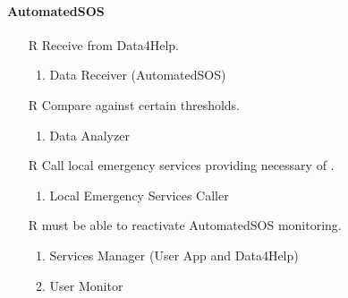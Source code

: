 \paragraph{AutomatedSOS}
\begin{itemize}
	\item[R\subs{36}]Receive  from Data4Help.
	\begin{enumerate}
		\item Data Receiver (AutomatedSOS)
	\end{enumerate}
	\item[R\subs{37}]Compare  against certain thresholds.
	\begin{enumerate}
		\item Data Analyzer
	\end{enumerate}
	\item[R\subs{38}]Call local emergency services providing necessary  of .
	\begin{enumerate}
		\item Local Emergency Services Caller
	\end{enumerate}
	\item[R\subs{39}] must be able to reactivate AutomatedSOS monitoring.
	\begin{enumerate}
		\item Services Manager (User App and Data4Help)
		\item User Monitor
	\end{enumerate}
\end{itemize}


